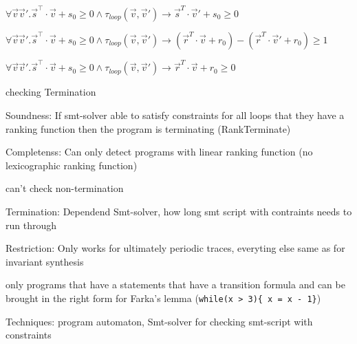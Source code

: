 \documentclass[a4paper]{article}
\begin{document}
\begin{minipage}[t]{0.16\linewidth}
\begin{betterlist}
{{\begin{betterlist}
\begin{betterlist}
\begin{betterlist}
							\item $\forall\vec{v}\vec{v}'.\vec{s}^⊺\cdot \vec{v} + s_0 \geq 0 \land \tau_{loop}(\vec{v},\vec{v}') \rightarrow\vec{s}^T\cdot \vec{v}' + s_0 \geq 0$
							\item $\forall\vec{v}\vec{v}'.\vec{s}^⊺\cdot \vec{v} + s_0 \geq 0 \land \tau_{loop}(\vec{v},\vec{v}') \rightarrow (\vec{r}^T\cdot \vec{v} + r_0) −(\vec{r}^T\cdot \vec{v}'  + r_0) \geq 1$
							\item $\forall\vec{v}\vec{v}'.\vec{s}^⊺\cdot \vec{v} + s_0 \geq 0 \land \tau_{loop}(\vec{v},\vec{v}') \rightarrow\vec{r}^T\cdot \vec{v} + r_0 \geq 0$
						\end{betterlist}
					\end{betterlist}
					\item checking Termination
					\item \alert{Soundness:} If smt-solver able to satisfy constraints for all loops that they have a ranking function then the program is terminating (RankTerminate)
					\item \alert{Completenss:} Can only detect programs with linear ranking function (no lexicographic ranking function)
					\begin{betterlist}
						\item can't check non-termination
					\end{betterlist}
					\item \alert{Termination:} Dependend Smt-solver, how long smt script with contraints needs to run through
					\item \alert{Restriction:} Only works for ultimately periodic traces, everyting else same as for invariant synthesis
					\begin{betterlist}
						\item only programs that have a statements that have a transition formula and can be brought in the right form for Farka's lemma (\texttt{while(x > 3)\{ x = x - 1\}})
					\end{betterlist}
					\item \alert{Techniques:} program automaton, Smt-solver for checking smt-script with constraints
				\end{betterlist}
			}}
	\end{betterlist}
\end{minipage}
\end{document}
